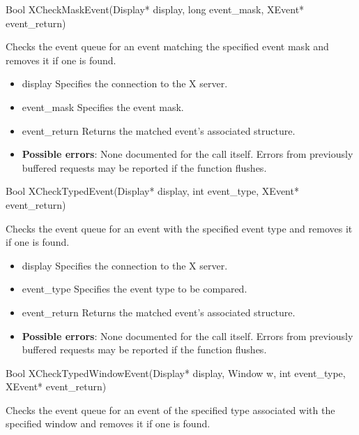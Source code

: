\documentclass{report}
\begin{document}
\begin{itemize}
        \begin{cppcode}
            Bool XCheckMaskEvent(Display* display, long event_mask, XEvent* event_return)
        \end{cppcode}
        \bigbreak \noindent
        Checks the event queue for an event matching the specified event mask and removes it if one is found.

        \begin{itemize}
            \item display Specifies the connection to the X server.
            \item event\_mask Specifies the event mask.
            \item event\_return Returns the matched event’s associated structure.
        \end{itemize}

        \begin{itemize}
            \item \textbf{Possible errors}: None documented for the call itself. Errors from previously buffered requests may be reported if the function flushes.
        \end{itemize}

        \begin{cppcode}
            Bool XCheckTypedEvent(Display* display, int event_type, XEvent* event_return)
        \end{cppcode}
        \bigbreak \noindent
        Checks the event queue for an event with the specified event type and removes it if one is found.

        \begin{itemize}
            \item display Specifies the connection to the X server.
            \item event\_type Specifies the event type to be compared.
            \item event\_return Returns the matched event’s associated structure.
        \end{itemize}

        \begin{itemize}
            \item \textbf{Possible errors}: None documented for the call itself. Errors from previously buffered requests may be reported if the function flushes.
        \end{itemize}

        \begin{cppcode}
            Bool XCheckTypedWindowEvent(Display* display, Window w, int event_type, XEvent* event_return)
        \end{cppcode}
        \bigbreak \noindent
        Checks the event queue for an event of the specified type associated with the specified window and removes it if one is found.


\end{itemize}
\end{document}
